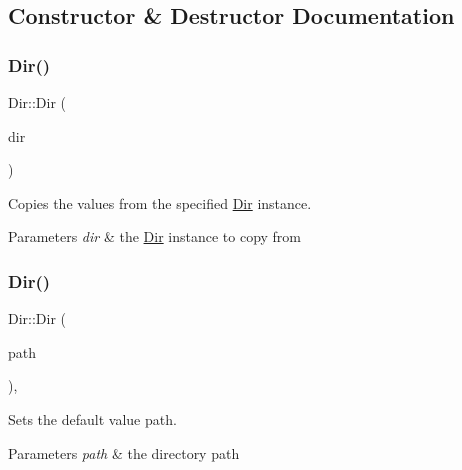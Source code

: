 \subsection{Constructor \& Destructor Documentation}
\mbox{\label{class_dir_a11b1a16ab3197a15c3807df0e09fce4e}} 
\subsubsection{\texorpdfstring{Dir()}{Dir()}\hspace{0.1cm}{\footnotesize\ttfamily [1/2]}}
{\footnotesize\ttfamily Dir\+::\+Dir (\begin{DoxyParamCaption}\item[{const \mbox{\hyperlink{class_dir}{Dir}} \&}]{dir }\end{DoxyParamCaption})}



Copies the values from the specified \mbox{\hyperlink{class_dir}{Dir}} instance. 


\begin{DoxyParams}{Parameters}
{\em dir} & the \mbox{\hyperlink{class_dir}{Dir}} instance to copy from \\
\hline
\end{DoxyParams}
\mbox{\label{class_dir_af683b1177318b82b880e21356750a6e0}} 
\subsubsection{\texorpdfstring{Dir()}{Dir()}\hspace{0.1cm}{\footnotesize\ttfamily [2/2]}}
{\footnotesize\ttfamily Dir\+::\+Dir (\begin{DoxyParamCaption}\item[{const \mbox{\hyperlink{class_a_string}{A\+String}} \&}]{path }\end{DoxyParamCaption})\hspace{0.3cm}{\ttfamily [explicit]}, {\ttfamily [noexcept]}}



Sets the default value path. 


\begin{DoxyParams}{Parameters}
{\em path} & the directory path \\
\hline
\end{DoxyParams}


